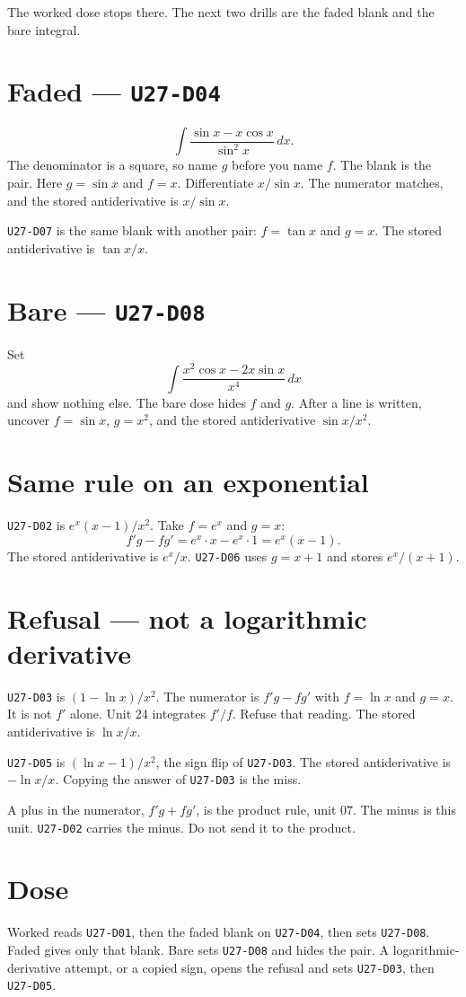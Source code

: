 The worked dose stops there. The next two drills are the faded blank and the bare integral.

\section{Faded --- \texttt{U27-D04}}
\[
\int\frac{\sin x-x\cos x}{\sin^2 x}\,dx.
\]
The denominator is a square, so name $g$ before you name $f$. The blank is the pair. Here $g=\sin x$ and $f=x$. Differentiate $x/\sin x$. The numerator matches, and the stored antiderivative is $x/\sin x$.

\texttt{U27-D07} is the same blank with another pair: $f=\tan x$ and $g=x$. The stored antiderivative is $\tan x/x$.

\section{Bare --- \texttt{U27-D08}}
Set
\[
\int\frac{x^2\cos x-2x\sin x}{x^4}\,dx
\]
and show nothing else. The bare dose hides $f$ and $g$. After a line is written, uncover $f=\sin x$, $g=x^2$, and the stored antiderivative $\sin x/x^2$.

\section{Same rule on an exponential}
\texttt{U27-D02} is $e^x(x-1)/x^2$. Take $f=e^x$ and $g=x$:
\[
f'g-fg'=e^x\cdot x-e^x\cdot 1=e^x(x-1).
\]
The stored antiderivative is $e^x/x$. \texttt{U27-D06} uses $g=x+1$ and stores $e^x/(x+1)$.

\section{Refusal --- not a logarithmic derivative}
\texttt{U27-D03} is $(1-\ln x)/x^2$. The numerator is $f'g-fg'$ with $f=\ln x$ and $g=x$. It is not $f'$ alone. Unit 24 integrates $f'/f$. Refuse that reading. The stored antiderivative is $\ln x/x$.

\texttt{U27-D05} is $(\ln x-1)/x^2$, the sign flip of \texttt{U27-D03}. The stored antiderivative is $-\ln x/x$. Copying the answer of \texttt{U27-D03} is the miss.

A plus in the numerator, $f'g+fg'$, is the product rule, unit 07. The minus is this unit. \texttt{U27-D02} carries the minus. Do not send it to the product.

\section{Dose}
Worked reads \texttt{U27-D01}, then the faded blank on \texttt{U27-D04}, then sets \texttt{U27-D08}. Faded gives only that blank. Bare sets \texttt{U27-D08} and hides the pair. A logarithmic-derivative attempt, or a copied sign, opens the refusal and sets \texttt{U27-D03}, then \texttt{U27-D05}.

